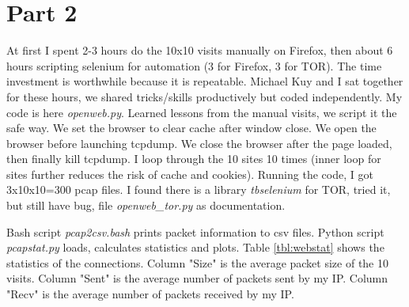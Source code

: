 \documentclass[11pt]{article}
\begin{document}
\section{Part 2}
\label{sec:part-2}

At first I spent 2-3 hours do the 10x10 visits manually on Firefox,
then about 6 hours scripting selenium for automation (3 for Firefox, 3 for TOR).
The time investment is worthwhile because it is repeatable.
Michael Kuy and I sat together for these hours, we shared tricks/skills productively
but coded independently. My code is here \textit{openweb.py}.
Learned lessons from the manual visits, we script it the safe way.
We set the browser to clear cache after window close.
We open the browser before launching tcpdump.
We close the browser after the page loaded, then finally kill tcpdump.
I loop through the 10 sites 10 times (inner loop for sites further reduces
the risk of cache and cookies).
Running the code, I got 3x10x10=300 pcap files.
I found there is a library \textit{tbselenium} for TOR, tried it,
but still have bug, file \textit{openweb\_tor.py} as documentation.

Bash script \textit{pcap2csv.bash} prints packet information to csv files.
Python script \textit{pcapstat.py} loads, calculates statistics and plots.
Table \ref{tbl:webstat} shows the statistics of the connections.
Column "Size" is the average packet size of the 10 visits.
Column "Sent" is the average number of packets sent by my IP.
Column "Recv" is the average number of packets received by my IP.
\end{document}
